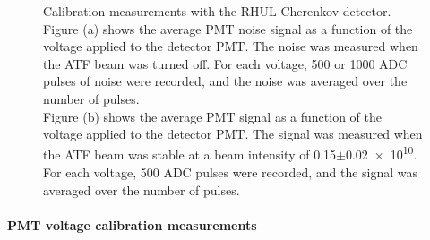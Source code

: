 \begin{figure}
{Calibration measurements with the RHUL Cherenkov detector.
\\Figure (a) shows the average PMT noise signal as a function of the voltage applied to the detector PMT.
The noise was measured when the ATF beam was turned off. 
For each voltage, 500 or 1000 ADC pulses of noise were recorded, and the noise was averaged over the number of pulses. 
\\Figure (b) shows the average PMT signal as a function of the voltage applied to the detector PMT. 
The signal was measured when the ATF beam was stable at a beam intensity of \num[detect-all]{0.15}$\pm$\num[detect-all]{0.02e10}. 
For each voltage, 500 ADC pulses were recorded, and the signal was averaged over the number of pulses.}
\label{fig:AverageNoise_VoltageNormalization}
\end{figure}

\paragraph{PMT voltage calibration measurements}

